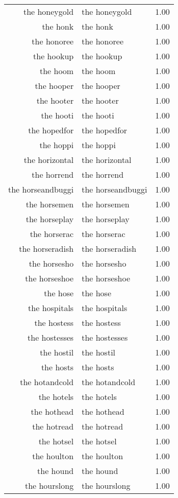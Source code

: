 \begin{table}[ht]
\begin{tabular}{rlr}
  the honeygold & the honeygold & 1.00 \\ 
  the honk & the honk & 1.00 \\ 
  the honoree & the honoree & 1.00 \\ 
  the hookup & the hookup & 1.00 \\ 
  the hoom & the hoom & 1.00 \\ 
  the hooper & the hooper & 1.00 \\ 
  the hooter & the hooter & 1.00 \\ 
  the hooti & the hooti & 1.00 \\ 
  the hopedfor & the hopedfor & 1.00 \\ 
  the hoppi & the hoppi & 1.00 \\ 
  the horizontal & the horizontal & 1.00 \\ 
  the horrend & the horrend & 1.00 \\ 
  the horseandbuggi & the horseandbuggi & 1.00 \\ 
  the horsemen & the horsemen & 1.00 \\ 
  the horseplay & the horseplay & 1.00 \\ 
  the horserac & the horserac & 1.00 \\ 
  the horseradish & the horseradish & 1.00 \\ 
  the horsesho & the horsesho & 1.00 \\ 
  the horseshoe & the horseshoe & 1.00 \\ 
  the hose & the hose & 1.00 \\ 
  the hospitals & the hospitals & 1.00 \\ 
  the hostess & the hostess & 1.00 \\ 
  the hostesses & the hostesses & 1.00 \\ 
  the hostil & the hostil & 1.00 \\ 
  the hosts & the hosts & 1.00 \\ 
  the hotandcold & the hotandcold & 1.00 \\ 
  the hotels & the hotels & 1.00 \\ 
  the hothead & the hothead & 1.00 \\ 
  the hotread & the hotread & 1.00 \\ 
  the hotsel & the hotsel & 1.00 \\ 
  the houlton & the houlton & 1.00 \\ 
  the hound & the hound & 1.00 \\ 
  the hourslong & the hourslong & 1.00 \\ 

\end{tabular}
\end{table}
